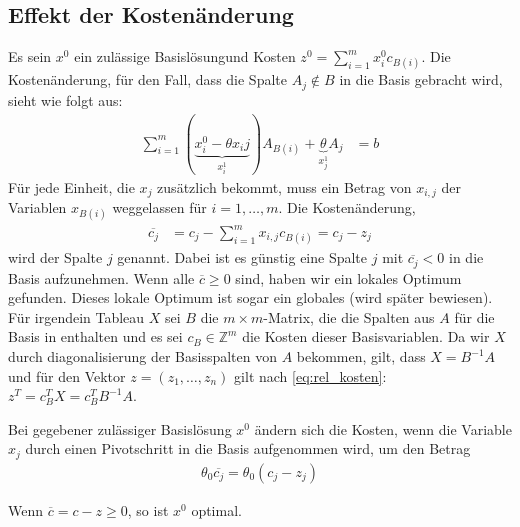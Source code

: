 \subsection{Effekt der Kostenänderung}
Es sein $x^0$ ein zulässige Basislösungund Kosten $z^0 = \sum_{i=1}^m x_i^0 c_{B(i)}$. Die Kostenänderung, für den Fall, dass die Spalte $A_j \notin B$ in die Basis gebracht wird, sieht wie folgt aus:
\begin{align*}
\sum_{i=1}^m (\underbrace{ x_i^0 - \theta x_ij }_{x_i^1}) A_{B(i)} + \underbrace{\theta}_{x_j^1} A_j &= b
\end{align*}
Für jede Einheit, die $x_j$ zusätzlich bekommt, muss ein Betrag von $x_{i,j}$ der Variablen $x_{B(i)}$ weggelassen für $i=1,\dotsc,m$. Die Kostenänderung,
\begin{align}
\overline{c_j} &= c_j - \sum_{i=1}^m x_{i,j} c_{B(i)} = c_j - z_j \label{eq:rel_kosten}
\end{align}
wird  der Spalte $j$ genannt. Dabei ist es günstig eine Spalte $j$ mit $\overline{c_j} < 0$ in die Basis aufzunehmen. Wenn alle $\overline{c} \geq 0$ sind, haben wir ein lokales Optimum gefunden. Dieses lokale Optimum ist sogar ein globales (wird später bewiesen).
Für irgendein Tableau $X$ sei $B$ die $m \times m$-Matrix, die die Spalten aus $A$ für die Basis in enthalten und es sei $c_B \in \mathbb Z^m$ die Kosten dieser Basisvariablen. Da wir $X$ durch diagonalisierung der Basisspalten von $A$ bekommen, gilt, dass $X=B^{-1}A$ und für den Vektor $z=(z_1,\dotsc,z_n)$ gilt nach \eqref{eq:rel_kosten}:
$z^T = c_B^TX = c_B^TB^{-1}A$.
\begin{theorem}
Bei gegebener zulässiger Basislösung $x^0$ ändern sich die Kosten, wenn die Variable $x_j$ durch einen Pivotschritt in die Basis aufgenommen wird, um den Betrag
\begin{align*}
\theta_0 \overline{c_j} = \theta_0 (c_j - z_j)
\end{align*}
\end{theorem}
Wenn $\overline{c} = c - z \geq 0$, so ist $x^0$ optimal.

